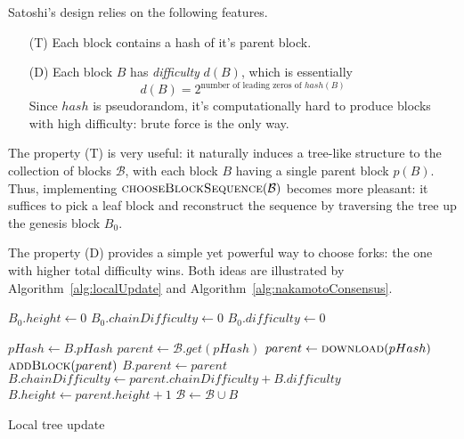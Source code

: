 \documentclass[a4paper]{article}
\begin{document}
Satoshi's design relies on the following features.
\begin{itemize}
   \item[(T)] Each block contains a hash of it's parent block. 

  \item[(D)] Each block $B$ has \emph{difficulty} $d(B)$, which is essentially 
$$
d(B) = 2^{\text{number of leading zeros of $hash(B)$}}
$$
Since $hash$ is pseudorandom, it's computationally hard to produce blocks with high difficulty: brute force is the only way.

\end{itemize}

The property (T) is very useful: it naturally induces a tree-like structure to the collection of blocks $\mathcal{B}$, with each block $B$ having a single parent block $p(B)$. Thus, implementing $\Call{chooseBlockSequence}{\mathcal{B}}$ becomes more pleasant: it suffices to pick a leaf block and reconstruct the sequence by traversing the tree up the genesis block $B_0$.


The property (D) provides a simple yet powerful way to choose forks: the one with higher total difficulty wins. 
Both ideas are illustrated by Algorithm~\ref{alg:localUpdate} and Algorithm~\ref{alg:nakamotoConsensus}.

\begin{algorithm} 
\begin{algorithmic}[1] 

\State $B_0.height \gets 0$
\State $B_0.chainDifficulty \gets 0$
\State $B_0.difficulty \gets 0$

  
  \State $pHash \gets B.pHash$
  	\State $parent \gets \mathcal{B}.get(pHash)$
  \Else
    \State $parent \gets \Call{download}{pHash}$ 	
    \State $\Call{addBlock}{parent}$ 
  \EndIf
  \State $B.parent \gets parent$
  \State $B.chainDifficulty \gets parent.chainDifficulty + B.difficulty$
  \State $B.height \gets parent.height + 1$ 
  \State $\mathcal{B} \gets \mathcal{B} \cup B$
\EndProcedure

\end{algorithmic}
\caption{Local tree update}
\label{alg:localUpdate}
\end{algorithm}
\end{document}
